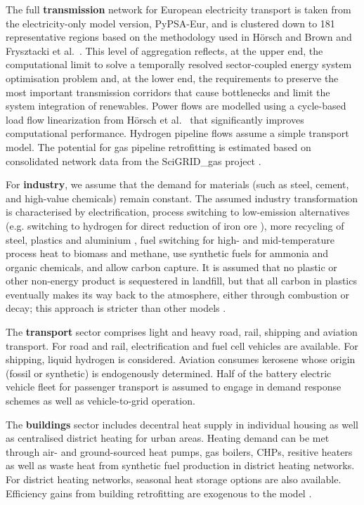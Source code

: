 The full \textbf{transmission} network for European electricity transport is
taken from the electricity-only model version,
PyPSA-Eur\cite{horschPyPSAEurOpen2018}, and is clustered down to 181
representative regions based on the methodology used in Hörsch and
Brown\cite{Hoersch2017} and Frysztacki et al.~\cite{frysztackiStrongEffect2021}.
This level of aggregation reflects, at the upper end, the computational limit to
solve a temporally resolved sector-coupled energy system optimisation problem
and, at the lower end, the requirements to preserve the most important
transmission corridors that cause bottlenecks and limit the system integration
of renewables. Power flows are modelled using a cycle-based load flow
linearization from Hörsch et al.~\cite{horschLinearOptimal2018} that
significantly improves computational performance. Hydrogen pipeline flows assume
a simple transport model. The potential for gas pipeline retrofitting is
estimated based on consolidated network data from the SciGRID\_gas project
\cite{plutaSciGRIDGas2022}.

For \textbf{industry}, we assume that the demand for materials (such as steel,
cement, and high-value chemicals) remain constant. The assumed industry
transformation is characterised by electrification, process switching to
low-emission alternatives (e.g. switching to hydrogen for direct reduction of
iron ore \cite{voglAssessmentHydrogen2018}), more recycling of steel, plastics
and aluminium \cite{circular_economy}, fuel switching for high- and
mid-temperature process heat to biomass and methane, use synthetic fuels for
ammonia and organic chemicals, and allow carbon capture. It is assumed that no
plastic or other non-energy product is sequestered in landfill, but that all
carbon in plastics eventually makes its way back to the atmosphere, either
through combustion or decay; this approach is stricter than other models
\cite{in-depth_2018}.

The \textbf{transport} sector comprises light and heavy road, rail, shipping and
aviation transport. For road and rail, electrification and fuel cell vehicles
are available. For shipping, liquid hydrogen is considered. Aviation consumes
kerosene whose origin (fossil or synthetic) is endogenously determined. Half of
the battery electric vehicle fleet for passenger transport is assumed to engage
in demand response schemes as well as vehicle-to-grid operation.

The \textbf{buildings} sector includes decentral heat supply in individual
housing as well as centralised district heating for urban areas. Heating demand
can be met through air- and ground-sourced heat pumps, gas boilers, CHPs,
resitive heaters as well as waste heat from synthetic fuel production in
district heating networks. For district heating networks, seasonal heat storage
options are also available. Efficiency gains from building retrofitting are
exogenous to the model \cite{zeyenMitigatingHeat2021}.

